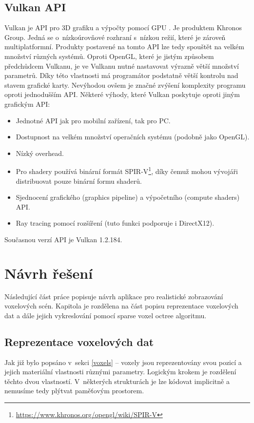 \section{Vulkan API}
Vulkan je API pro 3D grafiku a výpočty pomocí GPU \cite{vulkan_web}. Je produktem Khronos Group. Jedná se o~nízkoúrovňové rozhraní s~nízkou režií, které je zároveň multiplatformní. Produkty postavené na tomto API lze tedy spouštět na velkém množství různých systémů. Oproti OpenGL, které je jistým způsobem předchůdcem Vulkanu, je ve Vulkanu nutné nastavovat výrazně větší množství parametrů. Díky této vlastnosti má programátor podstatně větší kontrolu nad stavem grafické karty. Nevýhodou ovšem je značné zvýšení komplexity programu oproti jednodušším API. Některé výhody, které Vulkan poskytuje oproti jiným grafickým API:

\begin{itemize}
	\item Jednotné API jak pro mobilní zařízení, tak pro PC.
	\item Dostupnost na velkém množství operačních systému (podobně jako OpenGL).
	\item Nízký overhead.
	\item Pro shadery používá binární formát SPIR-V\footnote{\url{https://www.khronos.org/opengl/wiki/SPIR-V}}, díky čemuž mohou vývojáři distribuovat pouze binární formu shaderů.
	\item Sjednocení grafického (graphics pipeline) a výpočetního (compute shaders) API.
	\item Ray tracing pomocí rozšíření (tuto funkci podporuje i DirectX12).
\end{itemize}

Současnou verzí API je Vulkan 1.2.184\cite{vulkanspec}.

\chapter{Návrh řešení}
\label{navrh}
Následující část práce popisuje návrh aplikace pro realistické zobrazování voxelových scén. Kapitola je rozdělena na část popisu reprezentace voxelových dat a dále jejich vykreslování pomocí sparse voxel octree algoritmu.

\section{Reprezentace voxelových dat}\label{sec:voxel_representation}
Jak již bylo popsáno v~sekci \ref{voxels} -- voxely jsou reprezentovány svou pozicí a jejich materiální vlastnosti různými parametry. Logickým krokem je rozdělení těchto dvou vlastností. V~některých strukturách je lze kódovat implicitně a nemusíme tedy plýtvat paměťovým prostorem.

